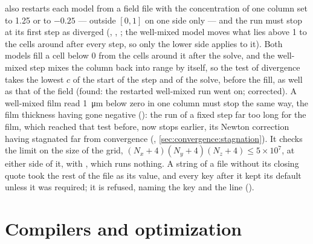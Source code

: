 also restarts each model from a field file
with the concentration of one column set to 1.25 or to $-0.25$ --- outside
$[0, 1]$ on one side only --- and the run must stop at its first step as
diverged (, ,
; the well-mixed model moves what lies above 1 to the
cells around after every step, so only the lower side applies to it). Both
models fill a cell below 0 from the cells around it after the solve, and the
well-mixed step mixes the column back into range by itself, so the test of
divergence takes the lowest $c$ of the start of the step and of the solve,
before the fill, as well as that of the field (found: the restarted well-mixed
run went on; corrected). A well-mixed film read \SI{1}{\micro\metre} below
zero in one column must stop the same way, the film thickness having gone
negative (): the run of a fixed step far too long for
the film, which reached that test before, now stops earlier, its Newton
correction having stagnated far from convergence (,
\cref{sec:convergence:stagnation}). It checks the limit on the size
of the grid, $(N_x+4)(N_y+4)(N_z+4) \le 5\times10^{7}$, at either side of it,
with , which runs nothing. A string of a 
file without its closing quote took the rest of the file as its value, and
every key after it kept its default unless it was required; it is refused,
naming the key and the line ().

\section{Compilers and optimization}
\label{sec:verification:compilers}

